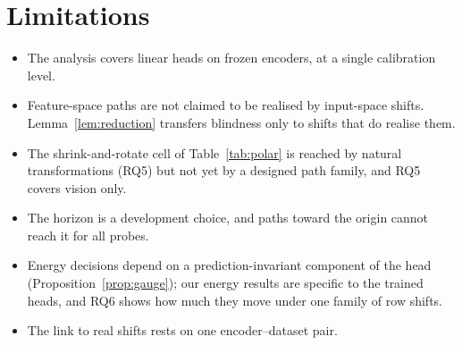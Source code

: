 \documentclass[11pt]{article}
\theoremstyle{definition}
\theoremstyle{remark}
\begin{document}
\section{Limitations}
\begin{itemize}
\item The analysis covers linear heads on frozen encoders, at a single calibration level.
\item Feature-space paths are not claimed to be realised by input-space shifts. Lemma~\ref{lem:reduction}
transfers blindness only to shifts that do realise them.
\item The shrink-and-rotate cell of Table~\ref{tab:polar} is reached by natural transformations
(RQ5) but not yet by a designed path family, and RQ5 covers vision only.
\item The horizon is a development choice, and paths toward the origin cannot reach it for all probes.
\item Energy decisions depend on a prediction-invariant component of the head
(Proposition~\ref{prop:gauge}); our energy results are specific to the trained heads, and RQ6 shows how
much they move under one family of row shifts.
\item The link to real shifts rests on one encoder--dataset pair.
\end{itemize}

\appendix
\end{document}
